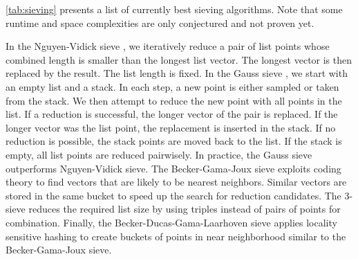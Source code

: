 \cref{tab:sieving} presents a list of currently best sieving algorithms. Note that some runtime and space complexities are only conjectured and not proven yet.

In the Nguyen-Vidick sieve \cite{NV08}, we iteratively reduce a pair of list points whose combined length is smaller than the longest list vector. The longest vector is then replaced by the result. The list length is fixed.
In the Gauss sieve \cite{MV10}, we start with an empty list and a stack. In each step, a new point is either sampled or taken from the stack. We then attempt to reduce the new point with all points in the list. If a reduction is successful, the longer vector of the pair is replaced. If the longer vector was the list point, the replacement is inserted in the stack. If no reduction is possible, the stack points are moved back to the list. If the stack is empty, all list points are reduced pairwisely. In practice, the Gauss sieve outperforms Nguyen-Vidick sieve.
The Becker-Gama-Joux sieve \cite{BGJ15} exploits coding theory to find vectors that are likely to be nearest neighbors. Similar vectors are stored in the same bucket to speed up the search for reduction candidates.
The 3-sieve \cite{BLS16, HK17} reduces the required list size by using triples instead of pairs of points for combination.
Finally, the Becker-Ducas-Gama-Laarhoven sieve \cite{BDGL16} applies locality sensitive hashing to create buckets of points in near neighborhood similar to the Becker-Gama-Joux sieve. %

















